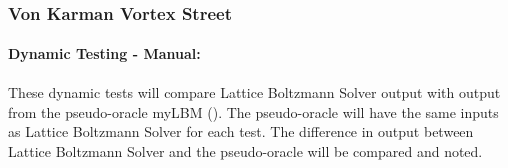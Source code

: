 \documentclass[12pt, titlepage]{article}
\newcommand{\famname}{Lattice Boltzmann Solver}
\begin{document}
~\newpage

\subsubsection{Von Karman Vortex Street}
\label{frvkvs}
		
\paragraph{Dynamic Testing - Manual:}
\paragraph{} These dynamic tests will compare {\famname} output with output from
the pseudo-oracle myLBM (\citet{pylbmcode}). The pseudo-oracle will have the
same inputs as {\famname} for each test. The difference in output between {\famname} and the pseudo-oracle will be compared and noted. %
\end{document}
